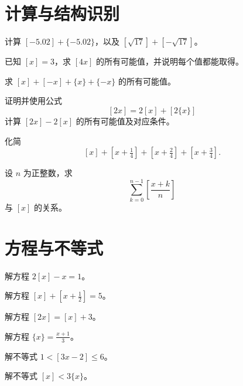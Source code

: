 \documentclass[11pt,a4paper,fontset=fandol]{ctexart}
\begin{document}
\section{计算与结构识别}
\begin{exercise}计算 $[-5.02]+\{-5.02\}$，以及 $[\sqrt{17}]+[-\sqrt{17}]$。\end{exercise}
\begin{exercise}已知 $[x]=3$，求 $[4x]$ 的所有可能值，并说明每个值都能取得。\end{exercise}
\begin{exercise}求 $[x]+[-x]+\{x\}+\{-x\}$ 的所有可能值。\end{exercise}
\begin{exercise}证明并使用公式
\[
[2x]=2[x]+[2\{x\}]
\]
计算 $[2x]-2[x]$ 的所有可能值及对应条件。\end{exercise}
\begin{exercise}化简
\[
[x]+[x+\tfrac14]+[x+\tfrac24]+[x+\tfrac34].
\]\end{exercise}
\begin{exercise}设 $n$ 为正整数，求
\[
\sum_{k=0}^{n-1}\left[\frac{x+k}{n}\right]
\]
与 $[x]$ 的关系。\end{exercise}

\section{方程与不等式}
\begin{exercise}解方程 $2[x]-x=1$。\end{exercise}
\begin{exercise}解方程 $[x]+[x+\frac12]=5$。\end{exercise}
\begin{exercise}解方程 $[2x]=[x]+3$。\end{exercise}
\begin{exercise}解方程 $\{x\}=\frac{x+1}{3}$。\end{exercise}
\begin{exercise}解不等式 $1<[3x-2]\le6$。\end{exercise}
\begin{exercise}解不等式 $[x]<3\{x\}$。\end{exercise}
\end{document}
